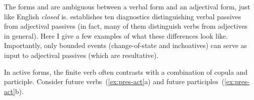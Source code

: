 \begin{exe}
\begin{xlist}
\begin{exe}
\begin{xlist}
\begin{exe}
\begin{exe}
\begin{xlist}
\begin{exe}
\begin{exe}
\begin{xlist}
\begin{exe}
\begin{xlist}
\begin{exe}
\begin{xlist}
\begin{exe}
\begin{xlist}
\begin{exe}
\begin{xlist}
\begin{xlist}
\begin{exe}
\begin{xlist}
\begin{exe}
\begin{xlist}
\begin{exe}
\begin{exe}
\begin{exe}
\begin{xlist}
\begin{exe}
\begin{exe}
\begin{xlist}
	
	
 \z
\z 

The forms {\mpua} and {\mhuf} are ambiguous between a verbal form and an adjectival form, just like English \emph{closed} is. \cite{doron00} establishes ten diagnostics distinguishing verbal passives from adjectival passives (in fact, many of them distinguish verbs from adjectives in general). Here I give a few examples of what these differences look like. Importantly, only bounded events (change-of-state and inchoatives) can serve as input to adjectival passives (which are resultative).

In active forms, the finite verb often contrasts with a combination of copula and participle. Consider future verbs~(\ref{ex:pres-act}a) and future participles~(\ref{ex:pres-act}b).
 \begin{exe}\judgewidth{\#}
 \ex  \label{ex:pres-act} 
 \begin{xlist} 
 
 

\end{xlist}
\end{exe}
\end{xlist}
\end{exe}
\end{exe}
\end{xlist}
\end{exe}
\end{exe}
\end{exe}
\end{xlist}
\end{exe}
\end{xlist}
\end{exe}
\end{xlist}
\end{xlist}
\end{exe}
\end{xlist}
\end{exe}
\end{xlist}
\end{exe}
\end{xlist}
\end{exe}
\end{xlist}
\end{exe}
\end{exe}
\end{xlist}
\end{exe}
\end{exe}
\end{xlist}
\end{exe}
\end{xlist}
\end{exe}
